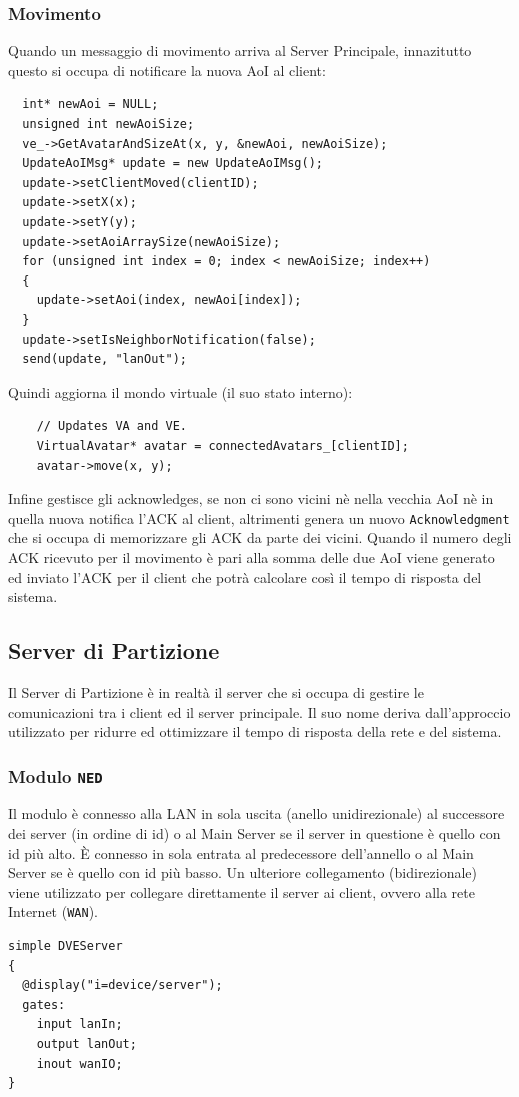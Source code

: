 \documentclass[a4paper, 11pt, oneside]{book}
\theoremstyle{definition}
\theoremstyle{remark}
\begin{document}
\subsubsection{Movimento}
Quando un messaggio di movimento arriva al Server Principale, innazitutto
questo si occupa di notificare la nuova AoI al client:
\begin{lstlisting}
  int* newAoi = NULL;
  unsigned int newAoiSize;
  ve_->GetAvatarAndSizeAt(x, y, &newAoi, newAoiSize);
  UpdateAoIMsg* update = new UpdateAoIMsg();
  update->setClientMoved(clientID);
  update->setX(x);
  update->setY(y);
  update->setAoiArraySize(newAoiSize);
  for (unsigned int index = 0; index < newAoiSize; index++)
  {
    update->setAoi(index, newAoi[index]);
  }
  update->setIsNeighborNotification(false);
  send(update, "lanOut");
\end{lstlisting}
Quindi aggiorna il mondo virtuale (il suo stato interno):
\begin{lstlisting}
    // Updates VA and VE.
    VirtualAvatar* avatar = connectedAvatars_[clientID];
    avatar->move(x, y);
\end{lstlisting}
Infine gestisce gli acknowledges, se non ci sono vicini nè nella vecchia AoI
nè in quella nuova notifica l'ACK al client, altrimenti genera un nuovo
\texttt{Acknowledgment} che si occupa di memorizzare gli ACK da parte dei
vicini. Quando il numero degli ACK ricevuto per il movimento è pari alla somma
delle due AoI viene generato ed inviato l'ACK per il client che potrà calcolare
così il tempo di risposta del sistema.

\subsection{Server di Partizione}
Il Server di Partizione è in realtà il server che si occupa di gestire le
comunicazioni tra i client ed il server principale. Il suo nome deriva
dall'approccio utilizzato per ridurre ed ottimizzare il tempo di risposta della
rete e del sistema.

\subsubsection{Modulo \texttt{NED}}
Il modulo è connesso alla LAN in sola uscita (anello unidirezionale) al
successore dei server (in ordine di id) o al Main Server se il server in
questione è quello con id più alto. \`E connesso in sola entrata al
predecessore dell'annello o al Main Server se è quello con id più basso. Un ulteriore
collegamento (bidirezionale) viene utilizzato per collegare direttamente
il server ai client, ovvero alla rete Internet (\texttt{WAN}).
\begin{lstlisting}
simple DVEServer
{
  @display("i=device/server");
  gates:
    input lanIn;
    output lanOut;
    inout wanIO;
}
\end{lstlisting}
\end{document}
